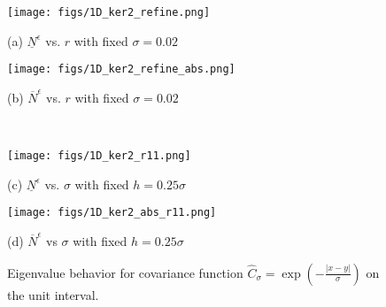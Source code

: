 \documentclass[11pt]{amsart}
\begin{document}
\begin{figure}[!htb]
	\begin{center}
		\hspace{-0.6cm}
		\begin{minipage}{0.46\textwidth}
			\texttt{[image: figs/1D\_ker2\_refine.png]}
			\caption*{(a) $\underline{N}^{\epsilon}$ vs. $r$ with fixed $\sigma=0.02$}
		\end{minipage}
		\hfil
		\begin{minipage}{0.46\textwidth}
			\texttt{[image: figs/1D\_ker2\_refine\_abs.png]}
			\caption*{(b) $\overline{N}^{\epsilon}$ vs. $r$ with fixed $\sigma=0.02$}
		\end{minipage}
		\\
		\vspace{0.3cm}
		\hspace{-0.6cm}
		\begin{minipage}{0.46\textwidth}
			\texttt{[image: figs/1D\_ker2\_r11.png]}
			\caption*{(c) $\underline{N}^{\epsilon}$ vs. $\sigma$ with fixed $h=0.25\sigma$}
		\end{minipage}
		\hfil
		\begin{minipage}{0.46\textwidth}
			\texttt{[image: figs/1D\_ker2\_abs\_r11.png]}
			\caption*{(d) $\overline{N}^{\epsilon}$ vs $\sigma$ with fixed $h=0.25\sigma$}
		\end{minipage}
		\caption{Eigenvalue behavior for covariance function $\hat{C}_{\sigma}=\exp(-\frac{|x-y|}{\sigma})$ on the unit interval.}
		\label{fig:1D-ker2}
	\end{center}
\end{figure}
\end{document}
